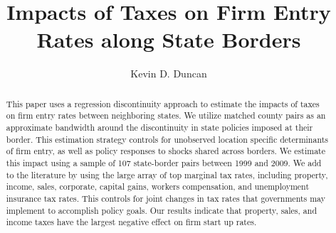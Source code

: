 \documentclass[12pt,a4paper]{article}
\renewcommand{\baselinestretch}{2}
\begin{document}
\title{Impacts of Taxes on Firm Entry Rates along State Borders}
\author{Kevin D. Duncan}
\date{}
\maketitle

\begin{abstract}
This paper uses a regression discontinuity approach to estimate the impacts of taxes on firm entry rates between neighboring states. We utilize matched county pairs as an approximate bandwidth around the discontinuity in state policies imposed at their border. This estimation strategy controls for unobserved location specific determinants of firm entry, as well as policy responses to shocks shared across borders. We estimate this impact using a sample of 107 state-border pairs between 1999 and 2009. We add to the literature by using the large array of top marginal tax rates, including property, income, sales, corporate, capital gains, workers compensation, and unemployment insurance tax rates. This controls for joint changes in tax rates that governments may implement to accomplish policy goals. Our results indicate that property, sales, and income taxes have the largest negative effect on firm start up rates. 
\end{abstract}

\newpage








\renewcommand{\baselinestretch}{1.0} 
\end{document}
